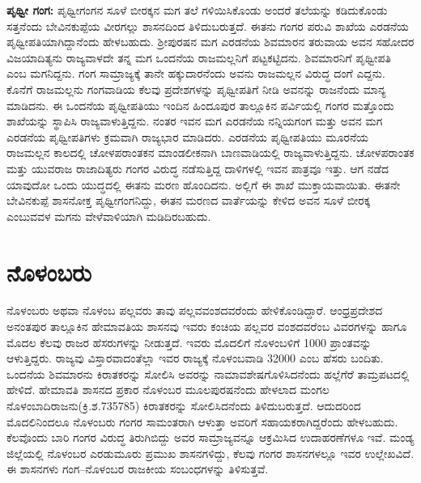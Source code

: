 \textbf{ಪೃಥ್ವೀ ಗಂಗ:} ಪೃಥ್ವೀಗಂಗನ ಸೂಳೆ ಬೀರಕ್ಕನ ಮಗ ತಲೆ ಗಳಿಯಿಸಿಕೊಂಡು ಅಂದರೆ ತಲೆಯನ್ನು ಕಡಿದುಕೊಂಡು ಸತ್ತನೆಂದು ಬೇವಿನಕುಪ್ಪೆಯ ವೀರಗಲ್ಲು ಶಾಸನದಿಂದ ತಿಳಿದುಬರುತ್ತದೆ. ಈತನು ಗಂಗರ ಪರುವಿ ಶಾಖೆಯ ಎರಡನೆಯ ಪೃಥ್ವೀಪತಿಯಾಗಿದ್ದಾನೆಂದು ಹೇಳಬಹುದು. ಶ‍್ರೀಪುರಷನ ಮಗ ಎರಡನೆಯ ಶಿವಮಾರನ ತರುವಾಯ ಅವನ ಸಹೋದರ ವಿಜಯಾದಿತ್ಯನು ರಾಜ್ಯವಾಳದೇ ತನ್ನ ಮಗ ಒಂದನೆಯ ರಾಜಮಲ್ಲನಿಗೆ ಪಟ್ಟಕಟ್ಟಿದನು. ಶಿವಮಾರನಿಗೆ ಪೃಥ್ವೀಪತಿ ಎಂಬ ಮಗನಿದ್ದನು. ಗಂಗ ಸಾಮ್ರಾಜ್ಯಕ್ಕೆ ತಾನೇ ಹಕ್ಕುದಾರನೆಂದು ಅವನು ರಾಜಮಲ್ಲನ ವಿರುದ್ಧ ದಂಗೆ ಎದ್ದನು. ಕೊನೆಗೆ ರಾಜಮಲ್ಲನು ಗಂಗವಾಡಿಯ ಕೆಲವು ಪ್ರದೇಶಗಳನ್ನು ಪೃಥ್ವೀಪತಿಗೆ ನೀಡಿ ಅವನನ್ನು ರಾಜನೆಂದು ಮಾನ್ಯ ಮಾಡಿದನು. ಈ ಒಂದನೆಯ ಪೃಥ್ವೀಪತಿಯು ಇಂದಿನ ಹಿಂದೂಪುರ ತಾಲ್ಲೂಕಿನ ಪರ್ವಿಯಲ್ಲಿ ಗಂಗರ ಮತ್ತೊಂದು ಶಾಖೆಯನ್ನು ಸ್ಥಾಪಿಸಿ ರಾಜ್ಯವಾಳುತ್ತಿದ್ದನು. ನಂತರ ಇವನ ಮಗ ಎರಡನೆಯ ನನ್ನಿಯಗಂಗ ಮತ್ತು ಅವನ ಮಗ ಎರಡನೆಯ ಪೃಥ್ವೀಪತಿಗಳು ಕ್ರಮವಾಗಿ ರಾಜ್ಯಭಾರ ಮಾಡಿದರು. ಎರಡನೆಯ ಪೃಥ್ವೀಪತಿಯು ಮೂರನೆಯ ರಾಜಮಲ್ಲನ ಕಾಲದಲ್ಲಿ ಚೋಳಪರಾಂತಕನ ಮಾಂಡಲೀಕನಾಗಿ ಬಾಣವಾಡಿಯಲ್ಲಿ ರಾಜ್ಯವಾಳುತ್ತಿದ್ದನು. ಚೋಳಪರಾಂತಕ ಮತ್ತು ಯುವರಾಜ ರಾಜಾದಿತ್ಯರು ಗಂಗರ ವಿರುದ್ಧ ನಡೆಸುತ್ತಿದ್ದ ದಾಳಿಗಳಲ್ಲಿ ಇವನ ಪಾತ್ರವೂ ಇತ್ತು. ಆಗ ನಡೆದ ಯಾವುದೋ ಒಂದು ಯುದ್ಧದಲ್ಲಿ ಈತನು ಮರಣ ಹೊಂದಿದನು. ಅಲ್ಲಿಗೆ ಈ ಶಾಖೆ ಮುಕ್ತಾಯವಾಯಿತು. ಈತನೇ ಬೇವಿನಕುಪ್ಪೆ ಶಾಸನೋಕ್ತ ಪೃಥ್ವೀಗಂಗನಿದ್ದು, ಈತನ ಮರಣದ ವಾರ್ತೆಯನ್ನು ಕೇಳಿದ ಅವನ ಸೂಳೆ ಬೀರಕ್ಕ ಎಂಬುವವಳ ಮಗನು ವೇಳೆವಾಳಿಯಾಗಿ ಮಡಿದಿರಬಹುದು.


\section{ನೊಳಂಬರು}

ನೊಳಂಬರು ಅಥವಾ ನೊಳಂಬ ಪಲ್ಲವರು ತಾವು ಪಲ್ಲವವಂಶದವರೆಂದು ಹೇಳಿಕೊಂಡಿದ್ದಾರೆ. ಆಂಧ್ರಪ್ರದೇಶದ ಅನಂತಪುರ ತಾಲ್ಲೂಕಿನ ಹೇಮಾವತಿಯ ಶಾಸನವು ಇವರು ಕಂಚಿಯ ಪಲ್ಲವರ ವಂಶದವರೆಂಬ ವಿವರಗಳನ್ನು ಹಾಗೂ ಮೊದಲ ಕೆಲವು ರಾಜರ ಹೆಸರುಗಳನ್ನು ನೀಡುತ್ತದೆ. ಇವರು ಮೊದಲಿಗೆ ನೊಳಂಬಳಿಗೆ 1000 ಪ್ರಾಂತವನ್ನು ಆಳುತ್ತಿದ್ದರು. ರಾಜ್ಯವು ವಿಸ್ತಾರವಾದಂತೆಲ್ಲಾ ಇವರ ರಾಜ್ಯಕ್ಕೆ ನೊಳಂಬವಾಡಿ 32000 ಎಂಬ ಹೆಸರು ಬಂದಿತು. ಒಂದನೆಯ ಶಿವಮಾರನು ಕಿರಾತಕರನ್ನು ಸೋಲಿಸಿ ಅವರನ್ನು ನಾಮಾವಶೇಷಗೊಳಿಸಿದನೆಂದು ಹಲ್ಲೆಗೆರೆ ತಾಮ್ರಪಟದಲ್ಲಿ ಹೇಳಿದೆ. ಹೇಮಾವತಿ ಶಾಸನದ ಪ್ರಕಾರ ನೊಳಂಬರ ಮೂಲಪುರಷನೆಂದು ಹೇಳಲಾದ ಮಂಗಲ ನೊಳಂಬಾದಿರಾಜನು(ಕ್ರಿ.ಶ.735785) ಕಿರಾತಕರನ್ನು ಸೋಲಿಸಿದನೆಂದು ತಿಳಿದುಬರುತ್ತದೆ. ಆದುದರಿಂದ ಮೊದಲಿನಿಂದಲೂ ನೊಳಂಬರು ಗಂಗರ ಸಾಮಂತರಾಗಿ ಆಳುತ್ತಾ ಅವರಿಗೆ ಸಹಾಯಕರಾಗಿದ್ದರೆಂದು ಹೇಳಬಹುದು. ಕೆಲವೊಂದು ಬಾರಿ ಗಂಗರ ವಿರುದ್ಧ ತಿರುಗಿಬಿದ್ದು ಅವರ ಸಾಮ್ರಾಜ್ಯವನ್ನೂ ಆಕ್ರಮಿಸಿದ ಉದಾಹರಣೆಗಳೂ ಇವೆ. ಮಂಡ್ಯ ಜಿಲ್ಲೆಯಲ್ಲಿ ನೊಳಂಬರ ಎರಡುಮೂರು ಪ್ರಮುಖ ಶಾಸನಗಳಿದ್ದು, ಕೆಲವು ಗಂಗರ ಶಾಸನಗಳಲ್ಲೂ ಇವರ ಉಲ್ಲೇಖವಿದೆ. ಈ ಶಾಸನಗಳು ಗಂಗ–ನೊಳಂಬರ ರಾಜಕೀಯ ಸಂಬಂಧಗಳನ್ನು ತಿಳಿಸುತ್ತವೆ.

